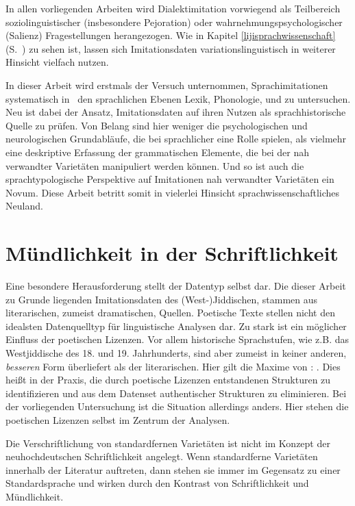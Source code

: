 In allen 
vorliegenden %
Arbeiten wird Dialektimitation vorwiegend als Teilbereich soziolinguistischer (insbesondere Pejoration) oder wahr\-nehmungs\-psycho\-logischer (Salienz) Fragestellungen herangezogen. Wie in Kapitel \ref{lijisprachwissenschaft} (S.\, \pageref{lijisprachwissenschaft}) zu sehen ist, lassen sich Imitationsdaten variationslinguistisch in weiterer Hinsicht vielfach nutzen.


In dieser Arbeit wird erstmals der Versuch unternommen, Sprachimitationen systematisch in \,%
 den sprachlichen Ebenen Lexik, Phonologie,  und   zu untersuchen. Neu ist dabei der Ansatz, Imitationsdaten auf ihren Nutzen als sprachhistorische Quelle zu prüfen. 
 Von Belang sind hier weniger die psychologischen und neurologischen Grundabläufe, die bei sprachlicher  eine Rolle spielen, als vielmehr eine deskriptive Erfassung der grammatischen Elemente, die bei der  nah verwandter Varietäten manipuliert werden können. Und so ist auch  die sprachtypologische Perspektive auf Imitationen nah verwandter Varietäten ein Novum. Diese Arbeit betritt somit in vielerlei Hinsicht sprachwissenschaftliches Neuland.
 


\section{Mündlichkeit in der Schriftlichkeit}\label{schmuendlichkeit}

Eine besondere Herausforderung stellt der Datentyp selbst dar. Die dieser Arbeit zu Grunde liegenden Imitationsdaten des (West-)Jiddischen, stammen aus literarischen, zumeist dramatischen, Quellen. Poetische Texte stellen nicht den idealsten Datenquelltyp für linguistische Analysen dar. Zu stark ist ein möglicher Einfluss der poetischen Lizenzen. Vor allem historische Sprachstufen, wie z.B. das Westjiddische des 18. und 19. Jahrhunderts, sind aber zumeist in keiner anderen, \textit{besseren} Form überliefert als der literarischen. Hier gilt die Maxime von  \cite[11]{Labov2010}: . Dies heißt in der Praxis, die durch poetische Lizenzen entstandenen Strukturen zu identifizieren und aus dem Datenset authentischer Strukturen zu eliminieren. Bei der vorliegenden Untersuchung ist die Situation allerdings anders. Hier stehen die poetischen Lizenzen selbst im Zentrum der Analysen.

Die Verschriftlichung von standardfernen Varietäten ist nicht im Konzept der neuhochdeutschen Schriftlichkeit angelegt. Wenn standardferne Varietäten innerhalb der Literatur auftreten, dann stehen sie immer im Gegensatz zu einer Standardsprache und wirken durch den Kontrast von Schriftlichkeit und Mündlichkeit. 

